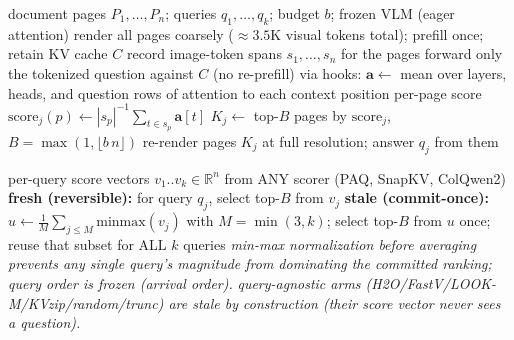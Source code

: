 \documentclass[11pt,letterpaper]{article}
\newcommand{\paq}{\textsc{PAQ}}
\begin{document}
\begin{algorithm}[t]
\caption{\paq{} per-query scorer and matched-budget selection (vision cells)}
\label{alg:paq}
\begin{algorithmic}[1]
\Require document pages $P_1,\ldots,P_n$; queries $q_1,\ldots,q_k$; budget $b$; frozen VLM (eager attention)
\State render all pages coarsely ($\approx\!3.5$K visual tokens total); prefill once; retain KV cache $C$
\State record image-token spans $s_1,\ldots,s_n$ for the pages
  \State forward only the tokenized question against $C$ (no re-prefill)
  \State via hooks: $\mathbf{a} \gets$ mean over layers, heads, and question rows of attention to
         each context position 
  \State per-page score $\mathrm{score}_j(p) \gets |s_p|^{-1}\sum_{t \in s_p} \mathbf{a}[t]$
  \State $K_j \gets$ top-$B$ pages by $\mathrm{score}_j$, $B = \max(1,\lfloor b\,n\rfloor)$
  \State re-render pages $K_j$ at full resolution; answer $q_j$ from them
\EndFor
\end{algorithmic}
\end{algorithm}

\begin{algorithm}[t]
\caption{Commit-once (stale) vs.\ re-select (fresh) deployments --- the reversibility contrast}
\label{alg:stale}
\begin{algorithmic}[1]
\Require per-query score vectors $v_1..v_k \in \mathbb{R}^n$ from ANY scorer (\paq{}, SnapKV, ColQwen2)
\State \textbf{fresh (reversible):} for query $q_j$, select top-$B$ from $v_j$ 
\State \textbf{stale (commit-once):} $u \gets \frac{1}{M}\sum_{j\le M}\mathrm{minmax}(v_j)$ with
       $M=\min(3,k)$; select top-$B$ from $u$ once; reuse that subset for ALL $k$ queries
\State \textit{min-max normalization before averaging prevents any single query's magnitude from
       dominating the committed ranking; query order is frozen (arrival order).}
\State \textit{query-agnostic arms (H2O/FastV/LOOK-M/KVzip/random/trunc) are stale by construction
       (their score vector never sees a question).}
\end{algorithmic}
\end{algorithm}
\end{document}
